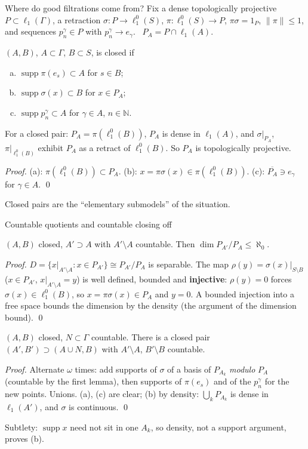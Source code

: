 \documentclass[10pt,aspectratio=169]{beamer}
\newcommand{\lo}[1]{\ell_1^0(#1)}
\newcommand{\ellone}[1]{\ell_1(#1)}
\newcommand{\supp}{\operatorname{supp}}
\newcommand{\NN}{\mathbb N}
\begin{document}
\begin{frame}{Where do good filtrations come from?}
  Fix a dense topologically projective $P\subset\ellone\Gamma$, a retraction
  $\sigma\colon P\to\lo S$, $\pi\colon\lo S\to P$, $\pi\sigma=1_P$, $\|\pi\|\le1$,
  and sequences $p^\gamma_n\in P$ with $p^\gamma_n\to e_\gamma$. \ $P_A=P\cap\ellone A$.
  \begin{definition}
    $(A,B)$, $A\subset\Gamma$, $B\subset S$, is \alert{closed} if
    \begin{enumerate}[(a)]
      \item $\supp\pi(e_s)\subset A$ for $s\in B$;
      \item $\supp\sigma(x)\subset B$ for $x\in P_A$;
      \item $\supp p^\gamma_n\subset A$ for $\gamma\in A$, $n\in\NN$.
    \end{enumerate}
  \end{definition}
  \begin{lemma}
    For a closed pair: $P_A=\pi(\lo B)$, $P_A$ is dense in $\ellone A$, and
    $\sigma|_{P_A}$, $\pi|_{\lo B}$ exhibit $P_A$ as a retract of $\lo B$.
    So $P_A$ is topologically projective.
  \end{lemma}
  \textit{Proof.} (a): $\pi(\lo B)\subset P_A$. (b): $x=\pi\sigma(x)\in\pi(\lo B)$.
  (c): $\overline{P_A}\ni e_\gamma$ for $\gamma\in A$. \qed
  \medskip

  Closed pairs are the ``elementary submodels'' of the situation.
\end{frame}

\begin{frame}{Countable quotients and countable closing off}
  \begin{lemma}
    $(A,B)$ closed, $A'\supset A$ with $A'\setminus A$ countable. Then
    $\dim P_{A'}/P_A\le\aleph_0$.
  \end{lemma}
  \textit{Proof.} $D=\{x|_{A'\setminus A}:x\in P_{A'}\}\cong P_{A'}/P_A$ is
  separable. The map $\rho(y)=\sigma(x)|_{S\setminus B}$ ($x\in P_{A'}$, $x|_{A'\setminus A}=y$)
  is well defined, bounded and \textbf{injective}: $\rho(y)=0$ forces
  $\sigma(x)\in\lo B$, so $x=\pi\sigma(x)\in P_A$ and $y=0$. A bounded injection
  into a free space bounds the dimension by the density (the argument of the
  dimension bound). \qed
  \begin{lemma}
    $(A,B)$ closed, $N\subset\Gamma$ countable. There is a closed pair
    $(A',B')\supset(A\cup N,B)$ with $A'\setminus A$, $B'\setminus B$ countable.
  \end{lemma}
  \textit{Proof.} Alternate $\omega$ times: add supports of $\sigma$ of a
  basis of $P_{A_k}$ \emph{modulo} $P_A$ (countable by the first lemma), then
  supports of $\pi(e_s)$ and of the $p^\gamma_n$ for the new points. Unions.
  (a), (c) are clear; (b) by density: $\bigcup_kP_{A_k}$ is dense in $\ellone{A'}$,
  and $\sigma$ is continuous. \qed
  \medskip

  Subtlety: $\supp x$ need not sit in one $A_k$, so density, not a support
  argument, proves (b).
\end{frame}
\end{document}

